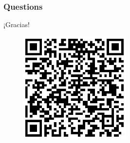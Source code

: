 \documentclass{beamer}
\begin{document}
\begin{frame}
\frametitle{Questions}
\centering
\Huge{¡Gracias!}
\begin{figure}
	\centering
	\includegraphics[width=0.5\textwidth]{images/qrcode.png}
\end{figure}
\end{frame}
\end{document}
